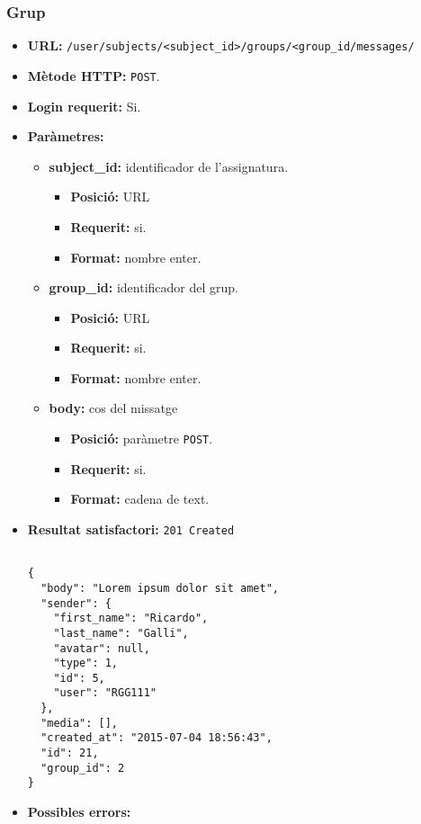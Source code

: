 	\subsubsection{Grup}
	\begin{itemize}
	\item \textbf{\ac{URL}:} \texttt{/user/subjects/<subject\_id>/groups/<group\_id/messages/}
	\item \textbf{Mètode \ac{HTTP}: } \texttt{POST}.
	\item \textbf{Login requerit:} Si.
	\item \textbf{Paràmetres:}
	\begin{itemize}
		\item \textbf{subject\_id:} identificador de l'assignatura.
		\begin{itemize}
			\item \textbf{Posició:} \ac{URL}
			\item \textbf{Requerit:} si.
			\item \textbf{Format:} nombre enter.
		\end{itemize}
		\item \textbf{group\_id:} identificador del grup.
		\begin{itemize}
			\item \textbf{Posició:} \ac{URL}
			\item \textbf{Requerit:} si.
			\item \textbf{Format:} nombre enter.
		\end{itemize}
		\item \textbf{body:} cos del missatge
		\begin{itemize}
			\item \textbf{Posició:} paràmetre \texttt{POST}.
			\item \textbf{Requerit:} si.
			\item \textbf{Format:} cadena de text.
		\end{itemize}
	\end{itemize}
	\item \textbf{Resultat satisfactori:} \texttt{201 Created}
	\begin{verbatim}
	
{
  "body": "Lorem ipsum dolor sit amet",
  "sender": {
    "first_name": "Ricardo",
    "last_name": "Galli",
    "avatar": null,
    "type": 1,
    "id": 5,
    "user": "RGG111"
  },
  "media": [],
  "created_at": "2015-07-04 18:56:43",
  "id": 21,
  "group_id": 2
}
	\end{verbatim}
	\item \textbf{Possibles errors:}
	\begin{itemize}


\end{itemize}
\end{itemize}
